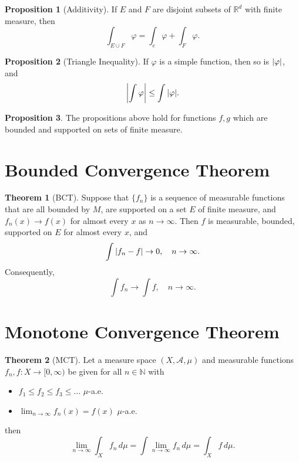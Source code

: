 \documentclass{article}
\theoremstyle{definition}
\newtheorem{prop}{Proposition}[section]
\newcommand{\R}{\mathbb{R}}
\theoremstyle{theorem}
\newtheorem{theorem}{Theorem}[section]
\begin{document}
\begin{prop}[Additivity]
If $E$ and $F$ are disjoint subsets of $\R^d$ with finite measure, then
\begin{equation*}
    \int_{E \cup F} \varphi = \int_e \varphi + \int_F \varphi.
\end{equation*}
\end{prop}

\begin{prop}[Triangle Inequality]
If $\varphi$ is a simple function, then so is $\abs{\varphi}$, and
\begin{equation*}
    \abs{\int \varphi} \leq \int \abs{\varphi}.
\end{equation*}
\end{prop}


\begin{prop}
The propositions above hold for functions $f,g$ which are bounded and supported on sets of finite measure.
\end{prop}




\section{Bounded Convergence Theorem}

\begin{theorem}[BCT]
 Suppose that $\{ f_n \}$ is a sequence of measurable functions that are all bounded by $M$, are supported on a set $E$ of finite measure, and $f_n(x) \to f(x)$ for almost every $x$ as $n\to \infty$. Then $f$ is measurable, bounded, supported on $E$ for almost every $x$, and
 \begin{equation*}
     \int \abs{f_n - f} \to 0, \quad n\to \infty.
 \end{equation*}
 Consequently, 
 \begin{equation*}
     \int f_n \to \int f, \quad n\to \infty.
 \end{equation*}
\end{theorem}




\section{Monotone Convergence Theorem}




\begin{theorem}[MCT]
Let a measure space $(X,\mathcal{A},\mu)$ and measurable functions $f_n,f: X\to [0,\infty)$ be given for all $n\in \mathbb{N}$ with
\begin{itemize}
    \item $f_1\leq f_2 \leq f_3 \leq \dots $ $\mu$-a.e.
    \item $\lim_{n\to \infty}f_n(x) = f(x)$ $\mu$-a.e. 
\end{itemize}
then 
\begin{equation*}
    \lim_{n\to \infty} \int_X f_n \,d\mu = \int \lim_{n\to \infty} f_n \,d\mu = \int_X f\,d\mu.
\end{equation*}
\end{theorem}
\end{document}
